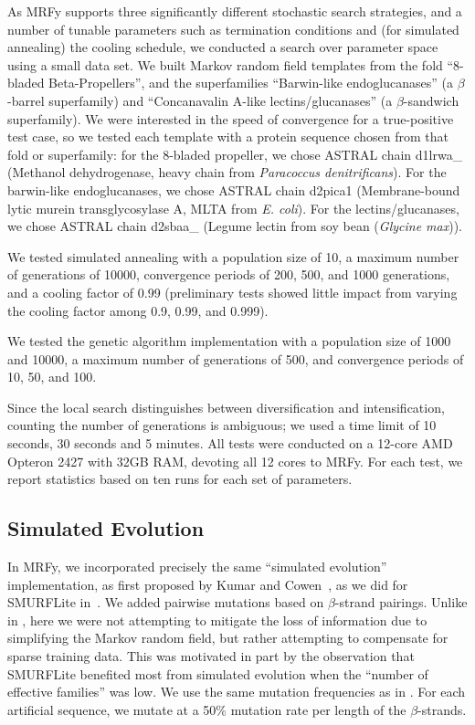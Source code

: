 \documentclass{acm_proc_article-sp}
\begin{document}
As MRFy supports three significantly different stochastic search strategies, and
a number of tunable parameters such as termination conditions and (for 
simulated annealing) the cooling schedule, we conducted a search over parameter
space using a small data set.
We built Markov random field templates from the fold ``8-bladed Beta-Propellers'', and the superfamilies ``Barwin-like endoglucanases'' (a 
$\beta$-barrel superfamily) and ``Concanavalin A-like lectins/glucanases'' (a 
$\beta$-sandwich superfamily).
We were interested in the speed of convergence for a true-positive test case,
so we tested each template with a protein sequence chosen from that fold or
superfamily: for the 8-bladed propeller, we chose ASTRAL chain d1lrwa\_
(Methanol dehydrogenase, heavy chain from  \emph{Paracoccus denitrificans}).
For the barwin-like endoglucanases, we chose ASTRAL chain d2pica1 
(Membrane-bound lytic murein transglycosylase A, MLTA from \emph{E. coli}).
For the lectins/glucanases, we chose ASTRAL chain d2sbaa\_ 
(Legume lectin from soy bean (\emph{Glycine max})).

We tested simulated annealing with a population size of 10, a maximum number of
generations of 10000, convergence periods of 200, 500, and 1000 generations, 
and a cooling factor of 0.99 (preliminary tests showed little impact from
varying the cooling factor among 0.9, 0.99, and 0.999).

We tested the genetic algorithm implementation with a population size of 1000 
and 10000, a maximum number of generations of 500, and convergence
periods of 10, 50, and 100.

Since the local search distinguishes between diversification and 
intensification, counting the number of generations is ambiguous; we used a time
limit of 10 seconds, 30 seconds and 5 minutes.
All tests were conducted on a 12-core AMD Opteron 2427 with 32GB RAM, devoting 
all 12 cores to MRFy.
For each test, we report statistics based on ten runs for each set of 
parameters.

\subsection{Simulated Evolution} \label{mrfy-simev}

In MRFy, we incorporated precisely the same ``simulated evolution'' 
implementation, as first proposed by Kumar and 
Cowen~\cite{Kumar:2009tp, Kumar:2010wv}, as we did for SMURFLite
in~\cite{Daniels:2012dg}.
We added pairwise mutations based on $\beta$-strand pairings.
Unlike in \citet{Daniels:2012dg}, 
here we were not attempting to mitigate
the loss of information due to simplifying the Markov random field, but rather
attempting to compensate for sparse training data.
This was motivated in part by the observation that SMURFLite benefited most
from simulated evolution when the ``number of effective families'' was low.
We use the same mutation frequencies as in \citet{Daniels:2012dg}.
For each artificial sequence, we mutate at a 50\% mutation rate per length of 
the $\beta$-strands. 
\end{document}
